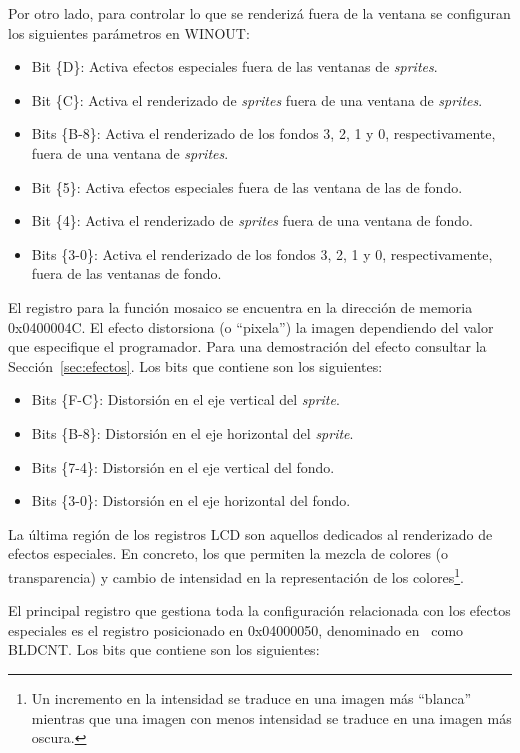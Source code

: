 Por otro lado, para controlar lo que se renderizá fuera de la ventana se configuran los siguientes parámetros en WINOUT:

\begin{itemize}
	\item Bit \{D\}: Activa efectos especiales fuera de las ventanas de \textit{sprites}.
	\item Bit \{C\}: Activa el renderizado de \textit{sprites} fuera de una ventana de \textit{sprites}.
	\item Bits \{B-8\}: Activa el renderizado de los fondos 3, 2, 1 y 0, respectivamente, fuera de una ventana de \textit{sprites}.
	\item Bit \{5\}: Activa efectos especiales fuera de las ventana de las de fondo.
	\item Bit \{4\}: Activa el renderizado de \textit{sprites} fuera de una ventana de fondo.
	\item Bits \{3-0\}: Activa el renderizado de los fondos 3, 2, 1 y 0, respectivamente, fuera de las ventanas de fondo.
\end{itemize}

El registro para la función mosaico se encuentra en la dirección de memoria 0x0400004C. El efecto distorsiona (o ``pixela'') la imagen dependiendo del valor que especifique el programador. Para una demostración del efecto consultar la Sección~\ref{sec:efectos}. Los bits que contiene son los siguientes:

\begin{itemize}
	\item Bits \{F-C\}: Distorsión en el eje vertical del \textit{sprite}.
	\item Bits \{B-8\}: Distorsión en el eje horizontal del \textit{sprite}.
	\item Bits \{7-4\}: Distorsión en el eje vertical del fondo.
	\item Bits \{3-0\}: Distorsión en el eje horizontal del fondo.
\end{itemize}

La última región de los registros LCD son aquellos dedicados al renderizado de efectos especiales. En concreto, los que permiten la mezcla de colores (o transparencia) y cambio de intensidad en la representación de los colores\footnote{Un incremento en la intensidad se traduce en una imagen más ``blanca'' mientras que una imagen con menos intensidad se traduce en una imagen más oscura.}.

El principal registro que gestiona toda la configuración relacionada con los efectos especiales es el registro posicionado en 0x04000050, denominado en~\cite{bib:gbatek} como BLDCNT. Los bits que contiene son los siguientes: 

